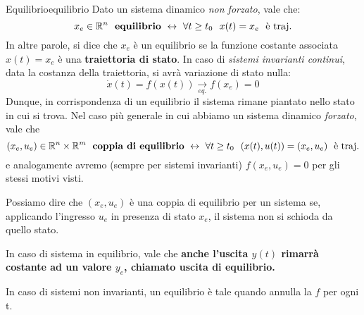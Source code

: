 \documentclass[a4paper]{report}
\begin{document}
\begin{defin}{Equilibrio}{equilibrio}
	Dato un sistema dinamico \textit{non forzato}, vale che:
	\begin{equation}
		x_e\in \R^n \ \ \textrm{\textbf{equilibrio}} \ \leftrightarrow \ \forall t \geq t_0 \ \ x(t)=x_e \ \ \textrm{è traj.}
	\end{equation}
	In altre parole, si dice che $x_e$ è un equilibrio se la funzione costante associata $x(t) = x_e$ è una \textbf{traiettoria di stato}. In caso di \textit{sistemi invarianti continui}, data la costanza della traiettoria, si avrà  variazione di stato nulla:
	\begin{equation*}
		\dot x(t) = f(x(t)) \xrightarrow[eq.]{}\boxed{f(x_e) = 0}
	\end{equation*}
	Dunque, in corrispondenza di un equilibrio il sistema rimane piantato nello stato in cui si trova.
	\bb
	Nel caso più generale in cui abbiamo un sistema dinamico \textit{forzato}, vale che
	\begin{equation}
			(x_e, u_e)\in \R^n \times \R^m \ \ \textrm{\textbf{coppia di equilibrio}} \ \leftrightarrow \ \forall t \geq t_0 \ \ (x(t), u(t))=(x_e, u_e) \ \ \textrm{è traj.}
	\end{equation}
	e analogamente avremo (sempre per sistemi invarianti) $\boxed{f(x_e,u_e) = 0}$ per gli stessi motivi visti.
\end{defin}
Possiamo dire che $(x_e, u_e)$ è una coppia di equilibrio per un sistema se, applicando l'ingresso $u_e$ in presenza di stato $x_e$, il sistema non si schioda da quello stato.
\begin{lemma}
In caso di sistema in equilibrio, vale che \textbf{anche l'uscita $y(t)$ rimarrà costante ad un valore $y_e$, chiamato uscita di equilibrio.}
\end{lemma}
\begin{lemma}
	In caso di sistemi non invarianti, un equilibrio è tale quando annulla la $f$ per ogni t.
\end{lemma}
\end{document}
